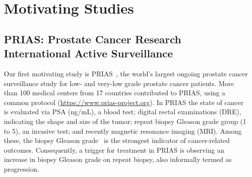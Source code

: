 \section{Motivating Studies}
\label{c1:sec:motivating_studies}

\subsection{PRIAS: Prostate Cancer Research International Active Surveillance}
\label{c1:subsec:PRIAS}
Our first motivating study is PRIAS~\citep{bul2013active}, the world's largest ongoing prostate cancer surveillance study for low- and very-low grade prostate cancer patients. More than 100 medical centers from 17 countries contributed to PRIAS, using a common protocol (\url{https://www.prias-project.org}). In PRIAS the state of cancer is evaluated via PSA (ng/mL), a blood test; digital rectal examinations (DRE), indicating the shape and size of the tumor; repeat biopsy Gleason grade group (1 to 5), an invasive test; and recently magnetic resonance imaging (MRI). Among these, the biopsy Gleason grade~\citep{epsteinGG2014} is the strongest indicator of cancer-related outcomes. Consequently, a trigger for treatment in PRIAS is observing an increase in biopsy Gleason grade on repeat biopsy, also informally termed as progression. 

